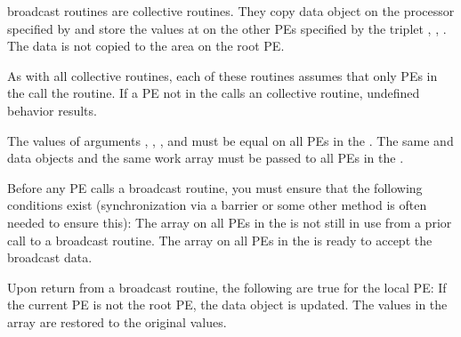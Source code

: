 {   
\openshmem broadcast routines are collective routines.
They copy data object \source{} on the processor specified by  and
store the values at \target{} on the other \ac{PE}s specified by the triplet
, , .  The data is not copied to the \target{} area on the root \ac{PE}.

As with all \openshmem collective routines, each of these routines assumes
that only \ac{PE}s in the \activeset{} call the routine.  If a \ac{PE} not in the
\activeset{} calls an \openshmem collective routine, undefined behavior
results.

The values of arguments , , , and  must be equal on all \ac{PE}s in the \activeset.  The same \target{} and \source{} data objects and the same  work array must be passed to all \ac{PE}s in the \activeset.

Before any \ac{PE} calls a broadcast routine, you must ensure that the
following conditions exist (synchronization via a barrier or some other
method is often needed to ensure this): The  array on all \ac{PE}s in
the \activeset{} is not still in use from a prior call to a broadcast
routine.  The \target{} array on all \ac{PE}s in the \activeset{} is ready to
accept the broadcast data.

Upon return from a broadcast routine, the following are true for the
local \ac{PE}: If the current \ac{PE} is not the root \ac{PE}, the \target{} data object
is updated.  The values in the  array are restored to the original
values.
}
